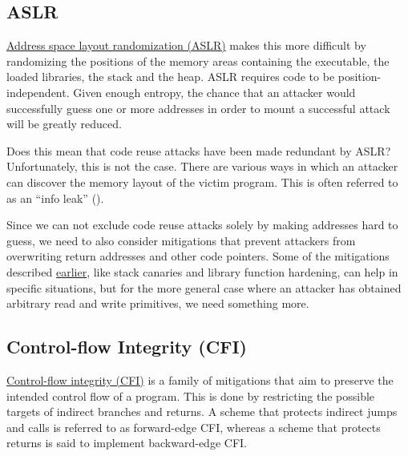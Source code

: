 \documentclass[
  a4paper,
]{report}
\begin{document}
\subsection{ASLR}\label{aslr}

\href{https://en.wikipedia.org/wiki/Address_space_layout_randomization}{\label{__index_entry_28}{Address
space layout randomization
(ASLR)}} makes this
more difficult by randomizing the positions of the memory areas
containing the executable, the loaded libraries, the stack and the heap.
ASLR requires code to be position-independent. Given enough entropy, the
chance that an attacker would successfully guess one or more addresses
in order to mount a successful attack will be greatly reduced.

Does this mean that code reuse attacks have been made redundant by ASLR?
Unfortunately, this is not the case. There are various ways in which an
attacker can discover the memory layout of the victim program. This is
often referred to as an ``\label{__index_entry_29}{info
leak}'' ().

Since we can not exclude code reuse attacks solely by making addresses
hard to guess, we need to also consider mitigations that prevent
attackers from overwriting return addresses and other code pointers.
Some of the mitigations described
\hyperref[stack-buffer-overflows]{earlier}, like stack canaries and
library function hardening, can help in specific situations, but for the
more general case where an attacker has obtained arbitrary read and
write primitives, we need something more.

\subsection{Control-flow Integrity
(CFI)}\label{control-flow-integrity-cfi}

\href{https://en.wikipedia.org/wiki/Control-flow_integrity}{\label{__index_entry_30}{Control-flow
integrity (CFI)}} is a family of
mitigations that aim to preserve the intended control flow of a program.
This is done by restricting the possible targets of indirect branches
and returns. A scheme that protects indirect jumps and calls is referred
to as \label{__index_entry_31}{forward-edge
CFI}, whereas a scheme that protects returns is
said to implement \label{__index_entry_32}{backward-edge
CFI}.
\end{document}
